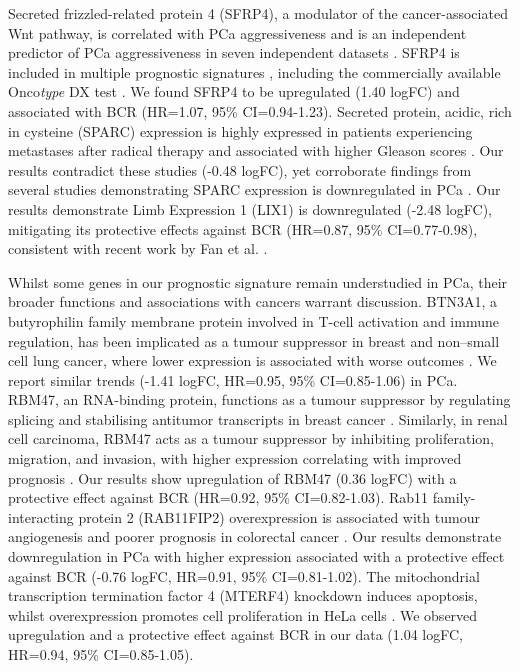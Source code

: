 \par

Secreted frizzled-related protein 4 (SFRP4), a modulator of the cancer-associated Wnt pathway, is correlated with PCa aggressiveness and is an independent predictor of PCa aggressiveness in seven independent datasets \cite{Mortensen2015Nov, Horvath2004Jan, Azad2015May, Sandsmark2017Oct}. SFRP4 is included in multiple prognostic signatures \cite{Feng2022Jan, Yimamu2022Dec}, including the commercially available Onco\textit{type} DX test \cite{Knezevic2013Oct}. We found SFRP4 to be upregulated (1.40 logFC) and associated with BCR (HR=1.07, 95\% CI=0.94-1.23). Secreted protein, acidic, rich in cysteine (SPARC) expression is highly expressed in patients experiencing metastases after radical therapy and associated with higher Gleason scores \cite{HutchSPARC, Lopez-Moncada2019Nov}. Our results contradict these studies (-0.48 logFC), yet corroborate findings from several studies demonstrating SPARC expression is downregulated in PCa \cite{Chekhun2024Feb, Shin2013Aug}. Our results demonstrate Limb Expression 1 (LIX1) is downregulated (-2.48 logFC), mitigating its protective effects against BCR (HR=0.87, 95\% CI=0.77-0.98), consistent with recent work by Fan et al. \cite{Fan2025Feb}. 

\par

Whilst some genes in our prognostic signature remain understudied in PCa, their broader functions and associations with cancers warrant discussion. BTN3A1, a butyrophilin family membrane protein involved in T-cell activation and immune regulation, has been implicated as a tumour suppressor in breast and non–small cell lung cancer, where lower expression is associated with worse outcomes \cite{Liang2021Aug}. We report similar trends (-1.41 logFC, HR=0.95, 95\% CI=0.85-1.06) in PCa. RBM47, an RNA-binding protein, functions as a tumour suppressor by regulating splicing and stabilising antitumor transcripts in breast cancer \cite{Vanharanta2014Jun}. Similarly, in renal cell carcinoma, RBM47 acts as a tumour suppressor by inhibiting proliferation, migration, and invasion, with higher expression correlating with improved prognosis \cite{Wang2023Dec}. Our results show upregulation of RBM47 (0.36 logFC) with a protective effect against BCR (HR=0.92, 95\% CI=0.82-1.03). Rab11 family-interacting protein 2 (RAB11FIP2) overexpression is associated with tumour angiogenesis and poorer prognosis in colorectal cancer \cite{Dong2018Dec, Xu2016Feb}. Our results demonstrate downregulation in PCa with higher expression associated with a protective effect against BCR (-0.76 logFC, HR=0.91, 95\% CI=0.81-1.02). The mitochondrial transcription termination factor 4 (MTERF4) knockdown induces apoptosis, whilst overexpression promotes cell proliferation in HeLa cells \cite{Yu2011May}. We observed upregulation and a protective effect against BCR in our data (1.04 logFC, HR=0.94, 95\% CI=0.85-1.05).

